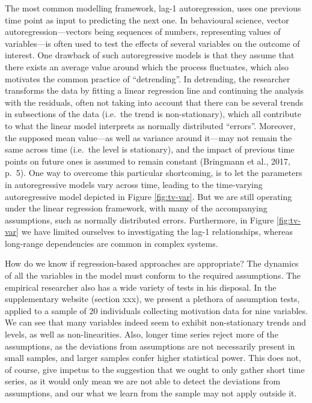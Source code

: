 \documentclass[
  british,
  man,floatsintext]{apa6}
\begin{document}
The most common modelling framework, lag-1 autoregression, uses one previous time point as input to predicting the next one. In behavioural science, vector autoregression---vectors being sequences of numbers, representing values of variables---is often used to test the effects of several variables on the outcome of interest. One drawback of such autoregressive models is that they assume that there exists an average value around which the process fluctuates, which also motivates the common practice of \enquote{detrending}. In detrending, the researcher transforms the data by fitting a linear regression line and continuing the analysis with the residuals, often not taking into account that there can be several trends in subsections of the data (i.e.~the trend is non-stationary), which all contribute to what the linear model interprets as normally distributed \enquote{errors}. Moreover, the supposed mean value---as well as variance around it---may not remain the same across time (i.e.~the level is stationary), and the impact of previous time points on future ones is assumed to remain constant (Bringmann et al., 2017, p.~5). One way to overcome this particular shortcoming, is to let the parameters in autoregressive models vary across time, leading to the time-varying autoregressive model depicted in Figure \ref{fig:tv-var}. But we are still operating under the linear regression framework, with many of the accompanying assumptions, such as normally distributed errors. Furthermore, in Figure \ref{fig:tv-var} we have limited ourselves to investigating the lag-1 relationships, whereas long-range dependencies are common in complex systems.

How do we know if regression-based approaches are appropriate? The dynamics of all the variables in the model must conform to the required assumptions. The empirical researcher also has a wide variety of tests in his disposal. In the supplementary website (section xxx), we present a plethora of assumption tests, applied to a sample of 20 individuals collecting motivation data for nine variables. We can see that many variables indeed seem to exhibit non-stationary trends and levels, as well as non-linearities. Also, longer time series reject more of the assumptions, as the deviations from assumptions are not necessarily present in small samples, and larger samples confer higher statistical power. This does not, of course, give impetus to the suggestion that we ought to only gather short time series, as it would only mean we are not able to detect the deviations from assumptions, and our what we learn from the sample may not apply outside it.
\end{document}
